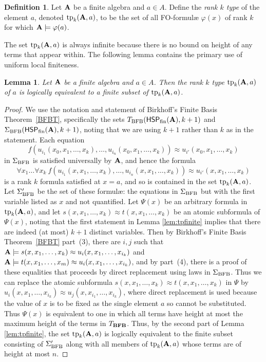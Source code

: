 \documentclass[10pt,a4paper]{amsart}
\theoremstyle{plain}
\newtheorem{lem}[thm]{Lemma}
\theoremstyle{definition}
\newtheorem{defn}[thm]{Definition}
\newcommand{\tp}{\operatorname{tp}}
\begin{document}
\begin{defn}
Let ${\bf A}$ be a finite algebra and $a\in A$. Define the \emph{rank $k$ type} of the element $a$, denoted $\tp_k({\bf A},a)$, to be the set of all  FO-formul{\ae} $\varphi(x)$ of rank $k$ for which ${\bf A}\models \varphi(a)$.
\end{defn}
The set $\tp_k({\bf A},a)$ is always infinite because there is no bound on height of any terms that appear within.  The following lemma contains the primary use of uniform local finiteness.
\begin{lem}\label{lem:finsubset}
Let ${\bf A}$ be a finite algebra and $a\in A$.  Then the rank $k$ type $\tp_k({\bf A},a)$ of $a$ is logically equivalent to a finite subset of $\tp_k({\bf A},a)$.
\end{lem}
\begin{proof}
We use the notation and statement of Birkhoff's Finite Basis Theorem~\ref{BFBT}, specifically the sets $T_{\rm BFB}(\mathsf{HSP}_{\rm fin}({\bf A}),k+1)$ and $\Sigma_{\rm BFB}(\mathsf{HSP}_{\rm fin}({\bf A}),k+1)$, noting that we are using $k+1$ rather than $k$ as in the statement.   Each equation 
\[
f(u_{i_1}(x_0,x_1,\dots,x_k),\dots, u_{i_n}(x_0,x_1,\dots,x_k))\approx u_{i'}(x_0,x_1,\dots,x_k)
\]
 in $\Sigma_{\rm BFB}$ is satisfied universally by ${\bf A}$, and hence the formula 
 \[
 \forall x_1\dots \forall x_k\ f(u_{i_1}(x,x_1,\dots,x_k),\dots, u_{i_n}(x,x_1,\dots,x_k))\approx u_{i'}(x,x_1,\dots,x_k)
 \]
  is a rank $k$ formula satisfied at $x=a$, and so is contained in the set $\tp_k({\bf A},a)$.   Let $\Sigma_{\rm BFB}'$ be the set of these formul{\ae}: the equations in $\Sigma_{\rm BFB}$ but with the first variable listed as $x$ and not quantified. Let $\Psi(x)$ be an arbitrary formula in $\tp_k({\bf A},a)$, and let $s(x,x_1,\dots,x_k)\approx t(x,x_1,\dots,x_k)$ be an atomic subformula of $\Psi(x)$, noting that the first statement in Lemma \ref{lem:tpfinite} implies that there are indeed (at most) $k+1$ distinct variables.   Then by Birkhoff's Finite Basis Theorem~\ref{BFBT} part~(3), there are $i,j$ such that  ${\bf A}\models s(x,x_1,\dots,x_k)\approx u_i(x,x_1,\dots,x_{i_k})$ and ${\bf A}\models t(x,x_1,\dots,x_m)\approx u_i(x,x_1,\dots,x_{i_k})$, and by part~(4), there is a proof of these equalities that proceeds by direct replacement using laws in $\Sigma_{\rm BFB}$.   Thus we can replace the atomic subformula $s(x,x_1,\dots,x_k)\approx t(x,x_1,\dots,x_k)$ in $\Psi$ by $u_i(x,x_1,\dots,x_{i_k})\approx u_j(x,x_{i_1},\dots,x_{i_k})$, where direct replacement is used because the value of $x$ is to be fixed as the single element $a$ so cannot be substituted.  Thus $\Psi(x)$ is equivalent to one in which all terms have height at most the maximum height of the terms in $T_{\bf BFB}$.  Thus, by the second part of Lemma \ref{lem:tpfinite}, the set $\tp_k({\bf A},a)$ is logically equivalent to the finite subset consisting of $\Sigma_{\rm BFB}'$ along with all members of $\tp_k({\bf A},a)$ whose terms are of height at most $n$. 
\end{proof}
\end{document}
